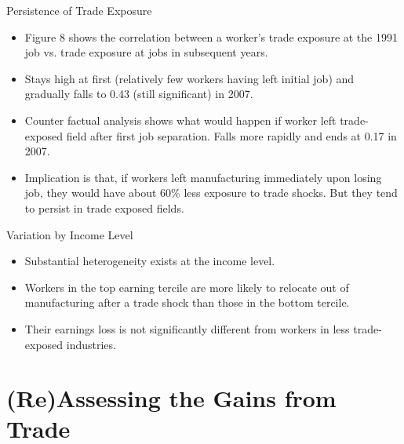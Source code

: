 \documentclass[aspectratio=169]{beamer}
\begin{document}

\begin{frame}{Persistence of Trade Exposure}

\begin{itemize}
    \item<1-> Figure 8 shows the correlation between a worker’s trade exposure at the 1991 job vs. trade exposure at jobs in subsequent years.
    \item<2-> Stays high at first (relatively few workers having left initial job) and gradually falls to 0.43 (still significant) in 2007.
    \item<3-> Counter factual analysis shows what would happen if worker left trade-exposed field after first job separation.  Falls more rapidly and ends at 0.17 in 2007.
    \item<4-> Implication is that, if workers left manufacturing immediately upon losing job, they would have about 60\% less exposure to trade shocks.  But they tend to persist in trade exposed fields.  
\end{itemize}
    
\end{frame}


\begin{frame}{Variation by Income Level}

\begin{itemize}
    \item<1-> Substantial heterogeneity exists at the income level.
    \item<2-> Workers in the top earning tercile are more likely to relocate out of manufacturing after a trade shock than those in the bottom tercile.
    \item<3-> Their earnings loss is not significantly different from workers in less trade-exposed industries.
\end{itemize}
    
\end{frame}


\section{(Re)Assessing the Gains from Trade}

\end{document}
